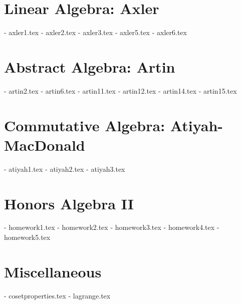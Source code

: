 \section{Linear Algebra: Axler}
- axler1.tex     %
- axler2.tex     %
- axler3.tex     %
- axler5.tex     %
- axler6.tex     %

\section{Abstract Algebra: Artin}
- artin2.tex     %
- artin6.tex     %
- artin11.tex     %
- artin12.tex     %
- artin14.tex     %
- artin15.tex     %

\section{Commutative Algebra: Atiyah-MacDonald}
- atiyah1.tex     %
- atiyah2.tex     %
- atiyah3.tex     %

\section{Honors Algebra II}
- homework1.tex
- homework2.tex
- homework3.tex
- homework4.tex
- homework5.tex

\section{Miscellaneous}
- cosetproperties.tex     %
- lagrange.tex     %
